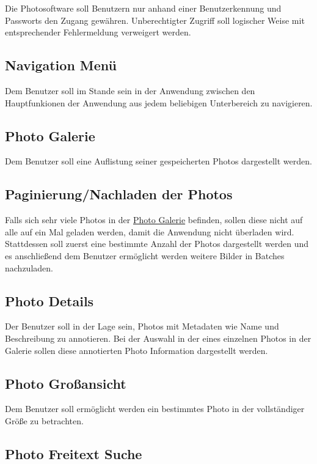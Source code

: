Die Photosoftware soll Benutzern nur anhand einer Benutzerkennung und Passworts 
den Zugang gewähren. Unberechtigter Zugriff soll logischer Weise mit entsprechender Fehlermeldung verweigert werden.

\subsection{Navigation Menü}

Dem Benutzer soll im Stande sein in der Anwendung zwischen den Hauptfunkionen der Anwendung aus jedem beliebigen Unterbereich zu navigieren.

\subsection{Photo Galerie}
\label{ssec:photo_galerie}

Dem Benutzer soll eine Auflistung seiner gespeicherten Photos dargestellt werden.

\subsection{Paginierung/Nachladen der Photos}

Falls sich sehr viele Photos in der \hyperref[ssec:photo_galerie]{Photo Galerie} befinden, sollen diese nicht auf alle auf ein Mal geladen werden, damit die Anwendung nicht überladen wird. Stattdessen soll zuerst eine bestimmte Anzahl der Photos dargestellt werden und es anschließend dem Benutzer ermöglicht werden weitere Bilder in Batches nachzuladen.

\subsection{Photo Details}

Der Benutzer soll in der Lage sein, Photos mit Metadaten wie Name und Beschreibung zu annotieren. Bei der Auswahl in der eines einzelnen Photos in 
der Galerie sollen diese annotierten Photo Information dargestellt werden.

\subsection{Photo Großansicht}

Dem Benutzer soll ermöglicht werden ein bestimmtes Photo in der vollständiger Größe zu betrachten.

\subsection{Photo Freitext Suche}
\label{ssec:photo_freitext_suche}


